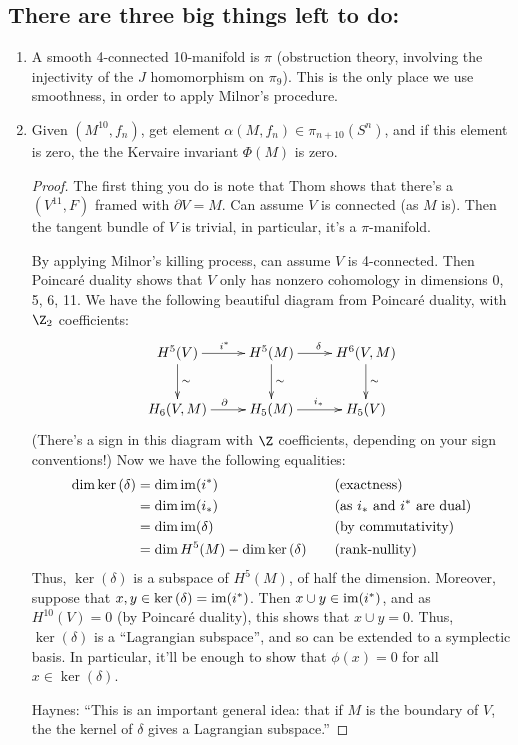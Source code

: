 \documentclass[11pt]{article}
\begin{document}
\begin{JandrKervaire}
\subsection*{There are three big things left to do:}
\begin{enumerate}
\item A smooth 4-connected 10-manifold is $\pi$ (obstruction theory, involving the injectivity of the $J$ homomorphism on $\pi_9$). This is the only place we use smoothness, in order to apply Milnor's procedure.
\item Given $(M^{10},f_n)$, get element $\alpha(M,f_n)\in\pi_{n+10}(S^n)$, and if this element is zero, the the Kervaire invariant $\Phi(M)$ is zero.
\begin{proof}
The first thing you do is note that Thom shows that there's a $(V^{11},F)$ framed with $\partial V=M$. Can assume $V$ is connected (as $M$ is). Then the tangent bundle of $V$ is trivial, in particular, it's a $\pi$-manifold.

By applying Milnor's killing process, can assume $V$ is 4-connected. Then Poincar\'e duality shows that $V$ only has nonzero cohomology in dimensions 0, 5, 6, 11. We have the following beautiful diagram from Poincar\'e duality, with $\Z_2$ coefficients:
\[\xymatrix{
H^5(V)\ar[d]^\sim\ar[r]^{i^*}& H^5(M)\ar[d]^\sim\ar[r]^\delta& H^6(V,M)\ar[d]^\sim\\
H_6(V,M)\ar[r]^\partial&H_5(M) \ar[r]^{i_*}&H_5(V)
}\]
(There's a sign in this diagram with $\Z$ coefficients, depending on your sign conventions!)
Now we have the following equalities:
\begin{alignat*}{2}
\dim\textup{ker}\,(\delta)&=\dim\operatorname{im}(i^*)&\quad& \text{(exactness)}\\
&=\dim\operatorname{im} (i_*)&&\text{(as $i_*$ and $i^*$ are dual)}\\
&=\dim\operatorname{im}(\delta)&&\text{(by commutativity)}\\
&=\dim H^5(M)-\dim\textup{ker}\,(\delta)&&\text{(rank-nullity)}
\end{alignat*}
Thus, $\ker(\delta)$ is a subspace of $H^5(M)$, of half the dimension. Moreover, suppose that $x,y\in\textup{ker}\,(\delta)=\operatorname{im}(i^*)$. Then $x\cup y\in\operatorname{im}(i^*)$, and as $H^{10}(V)=0$ (by Poincar\'e duality), this shows that $x\cup y=0$. Thus, $\ker(\delta)$ is a ``Lagrangian subspace'', and so can be extended to a symplectic basis. In particular, it'll be enough to show that $\phi(x)=0$ for all $x\in\ker(\delta)$.

Haynes: ``This is an important general idea: that if $M$ is the boundary of $V$, the the kernel of $\delta$ gives a Lagrangian subspace.''


\end{proof}
\end{enumerate}
\end{JandrKervaire}
\end{document}

